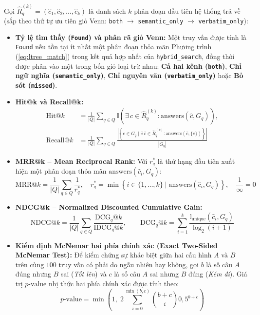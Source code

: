 Gọi $\hat{R}_q^{(k)} = (\hat{c}_1, \hat{c}_2, \dots, \hat{c}_k)$ là danh sách $k$ phân đoạn đầu tiên hệ thống trả về (sắp theo thứ tự ưu tiên giỏ Venn: \texttt{both} $\to$ \texttt{semantic\_only} $\to$ \texttt{verbatim\_only}):
\begin{itemize}
    \item \textbf{Tỷ lệ tìm thấy (\texttt{Found}) và phân rã giỏ Venn:} Một truy vấn được tính là \texttt{Found} nếu tồn tại ít nhất một phân đoạn thỏa mãn Phương trình (\ref{eq:ltree_match}) trong kết quả hợp nhất của \texttt{hybrid\_search}, đồng thời được phân vào một trong bốn giỏ loại trừ nhau: \textbf{Cả hai kênh (\texttt{both})}, \textbf{Chỉ ngữ nghĩa (\texttt{semantic\_only})}, \textbf{Chỉ nguyên văn (\texttt{verbatim\_only})} hoặc \textbf{Bỏ sót (\texttt{missed})}.
    \item \textbf{Hit@k và Recall@k:}
    \begin{equation}
    \begin{aligned}
        \text{Hit@}k &= \frac{1}{|Q|} \sum_{q \in Q} \mathbb{I}\!\left(\exists\, \hat{c} \in \hat{R}_q^{(k)} : \text{answers}(\hat{c}, G_q)\right), \\
        \text{Recall@}k &= \frac{1}{|Q|} \sum_{q \in Q} \frac{\left|\left\{e \in G_q \mid \exists\, \hat{c} \in \hat{R}_q^{(k)} : \text{answers}(\hat{c}, \{e\})\right\}\right|}{|G_q|}
    \end{aligned}
    \label{eq:recall_at_k}
    \end{equation}
    \item \textbf{MRR@k -- Mean Reciprocal Rank:} Với $r_q^*$ là thứ hạng đầu tiên xuất hiện một phân đoạn thỏa mãn $\text{answers}(\hat{c}_i, G_q)$:
    \begin{equation}
        \text{MRR@}k = \frac{1}{|Q|} \sum_{q \in Q} \frac{1}{r_q^*}, \quad r_q^* = \min\left\{i \in \{1, \dots, k\} \mid \text{answers}(\hat{c}_i, G_q)\right\}, \quad \frac{1}{\infty} = 0
        \label{eq:mrr}
    \end{equation}
    \item \textbf{NDCG@k -- Normalized Discounted Cumulative Gain:}
    \begin{equation}
        \text{NDCG@}k = \frac{1}{|Q|} \sum_{q \in Q} \frac{\text{DCG}_q\text{@}k}{\text{IDCG}_q\text{@}k}, \qquad
        \text{DCG}_q\text{@}k = \sum_{i=1}^{k} \frac{\mathbb{I}_{\text{unique}}(\hat{c}_i, G_q)}{\log_2(i + 1)}
        \label{eq:ndcg}
    \end{equation}
    \item \textbf{Kiểm định McNemar hai phía chính xác (Exact Two-Sided McNemar Test):} Để kiểm chứng sự khác biệt giữa hai cấu hình $A$ và $B$ trên cùng $100$ truy vấn có phải do ngẫu nhiên hay không, gọi $b$ là số câu $A$ đúng nhưng $B$ sai (\textit{Tốt lên}) và $c$ là số câu $A$ sai nhưng $B$ đúng (\textit{Kém đi}). Giá trị $p\text{-value}$ nhị thức hai phía chính xác được tính theo:
    \begin{equation}
        p\text{-value} = \min\!\left(1,\; 2 \sum_{i=0}^{\min(b, c)} \binom{b+c}{i} 0,5^{b+c}\right)
        \label{eq:mcnemar}
    \end{equation}
\end{itemize}

